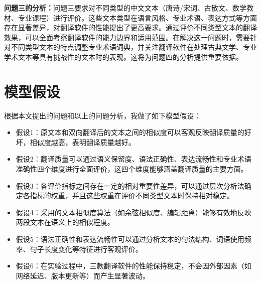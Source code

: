 \documentclass[bwprint]{cumcmthesis}
\begin{document}
\textbf{问题三的分析：}问题三要求对不同类型的中文文本（唐诗/宋词、古散文、数学教材、专业课程）进行评价。这些文本类型在语言风格、专业术语、表达方式等方面存在显著差异，对翻译软件的性能提出了更高要求。通过评价不同类型文本的翻译效果，可以全面考察翻译软件的能力边界和适用范围。在解决这一问题时，需要针对不同类型文本的特点调整专业术语词典，并关注翻译软件在处理古典文学、专业学术文本等具有挑战性的文本时的表现。这将为问题四的分析提供重要依据。


\section{模型假设}

根据本文提出的问题和以上的问题分析，我做了如下模型假设：

\begin{itemize}[itemindent=2em]
\item 假设1：原文本和双向翻译后的文本之间的相似度可以客观反映翻译质量的好坏，相似度越高，表明翻译质量越好。
\item 假设2：翻译质量可以通过语义保留度、语法正确性、表达流畅性和专业术语准确性四个维度进行全面评价，这四个维度能够涵盖翻译质量的主要方面。
\item 假设3：各评价指标之间存在一定的相对重要性差异，可以通过层次分析法确定各指标的权重，并且这些权重在评价不同类型文本时保持相对稳定。
\item 假设4：采用的文本相似度算法（如余弦相似度、编辑距离）能够有效地反映两段文本在语义上的相似程度。
\item 假设5：语法正确性和表达流畅性可以通过分析文本的句法结构、词语使用频率、句子长度变化等特征进行客观评价。
\item 假设6：在实验过程中，三款翻译软件的性能保持稳定，不会因外部因素（如网络延迟、版本更新等）而产生显著波动。
\end{itemize}

\end{document}
